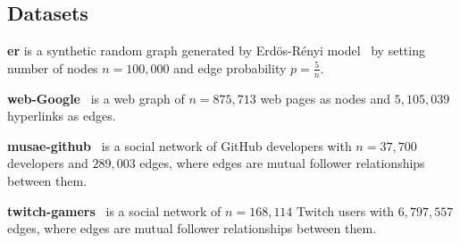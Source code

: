 \subsection{Datasets}\label{apx:data}
\textbf{er} is a synthetic random graph generated by Erd{\"{o}}s-R{\'{e}}nyi model~\citep{erdds1959random} by setting number of nodes $n=100,000$ and edge probability $p=\frac{5}{n}$.

\textbf{web-Google}~\citep{DBLP:journals/im/LeskovecLDM09}  is a web
graph of $n=875,713$ web pages as nodes and $5,105,039$ hyperlinks
as edges.

\textbf{musae-github}~\citep{rozemberczki2019multiscale} is a social network of GitHub developers with $n=37,700$ developers and $289,003$ edges,
where edges are mutual follower relationships between them.

\textbf{twitch-gamers}~\citep{rozemberczki2021twitch} is a social network of $n=168,114$ Twitch users with $6,797,557$ edges, 
where edges are mutual follower relationships between them.



